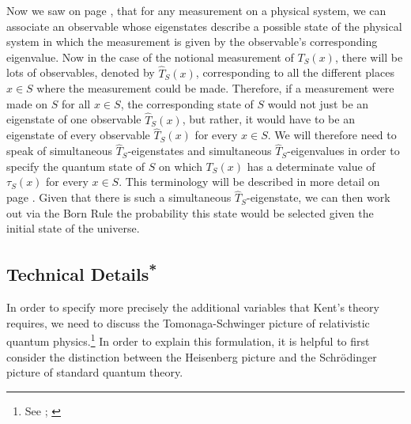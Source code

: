 \documentclass[12pt]{report}
\providecommand{\DIFaddbegin}{} %
\providecommand{\DIFaddend}{} %
\begin{document}
Now we saw on page \pageref{eigendef}, that for any measurement on a physical system, we can associate an observable whose eigenstates describe a possible state of the physical system in which the measurement is given by the observable's corresponding eigenvalue. Now in the case of the notional measurement of $T_S(x)$, there will be lots of observables, denoted by $\hat{T}_S(x)$, corresponding to all the different places $x\in S$ where the measurement could be made. Therefore, if a measurement were made on $S$ for all $x\in S$, the corresponding state of $S$ would not just be an eigenstate of one observable $\hat{T}_S(x)$,\label{firstHatTS} 
but rather, it would have to be an eigenstate of every observable $\hat{T}_S(x)$ for every $x\in S$. We will therefore need to speak of simultaneous $\hat{T}_S$-eigenstates and simultaneous $\hat{T}_S$-eigenvalues in order to specify the quantum state of $S$ on which $T_S(x)$ has a determinate value of $\tau_S(x)$ for every $x\in S$. This terminology will be described in more detail on page \pageref{simultaneous}.  Given that there is such a simultaneous $\hat{T}_S$-eigenstate, we can then work out via the Born Rule the probability this state would be selected given the initial state of the universe.

\subsection{Technical Details\textsuperscript{*}\DIFaddbegin \label{AdditionalVariablesDetails}\DIFaddend }  
In order to specify more precisely the additional variables that Kent's theory requires, we need to discuss the Tomonaga-Schwinger picture of relativistic quantum physics.\footnote{See \cite{SchwingerJulianI}; \cite{TomonagaI}} In order to explain this formulation, it is helpful to first consider  the distinction between the Heisenberg picture and the Schr\"{o}dinger picture of standard quantum theory. 
\end{document}
